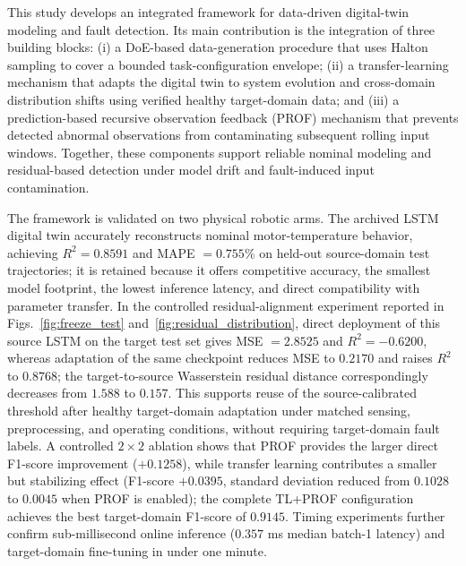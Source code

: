 \documentclass[a4paper,10pt]{cas-sc}%
\newenvironment{revision}{\color{revisionred}}{}
\begin{document}
\begin{revision}
	This study develops an integrated framework for data-driven digital-twin modeling and fault detection. Its main contribution is the integration of three building blocks: (i) a DoE-based data-generation procedure that uses Halton sampling to cover a bounded task-configuration envelope; (ii) a transfer-learning mechanism that adapts the digital twin to system evolution and cross-domain distribution shifts using verified healthy target-domain data; and (iii) a prediction-based recursive observation feedback (PROF) mechanism that prevents detected abnormal observations from contaminating subsequent rolling input windows. Together, these components support reliable nominal modeling and residual-based detection under model drift and fault-induced input contamination.

	The framework is validated on two physical robotic arms. The archived LSTM digital twin accurately reconstructs nominal motor-temperature behavior, achieving $R^2=0.8591$ and MAPE $=0.755\%$ on held-out source-domain test trajectories; it is retained because it offers competitive accuracy, the smallest model footprint, the lowest inference latency, and direct compatibility with parameter transfer. In the controlled residual-alignment experiment reported in Figs.~\ref{fig:freeze_test} and~\ref{fig:residual_distribution}, direct deployment of this source LSTM on the target test set gives MSE $=2.8525$ and $R^2=-0.6200$, whereas adaptation of the same checkpoint reduces MSE to $0.2170$ and raises $R^2$ to $0.8768$; the target-to-source Wasserstein residual distance correspondingly decreases from $1.588$ to $0.157$. This supports reuse of the source-calibrated threshold after healthy target-domain adaptation under matched sensing, preprocessing, and operating conditions, without requiring target-domain fault labels. A controlled $2\times2$ ablation shows that PROF provides the larger direct F1-score improvement ($+0.1258$), while transfer learning contributes a smaller but stabilizing effect (F1-score $+0.0395$, standard deviation reduced from $0.1028$ to $0.0045$ when PROF is enabled); the complete TL+PROF configuration achieves the best target-domain F1-score of $0.9145$. Timing experiments further confirm sub-millisecond online inference ($0.357$ ms median batch-1 latency) and target-domain fine-tuning in under one minute.


\end{revision}
\end{document}
